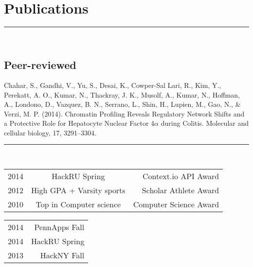 \documentclass[letterpaper]{deedy-resume} %
\begin{document}
\sectionspace

\section{Publications}
\normalfont
\hrule height .1pt \leavevmode \\
\vspace{2 mm}
\subsection{Peer-reviewed}
\textbullet{} Chahar, S., Gandhi, V., Yu, S., Desai, K., Cowper-Sal Lari, R., Kim, Y., Perekatt, A. O., Kumar, N., Thackray, J. K., Musolf, A., Kumar, N., Hoffman, A., Londono, D., Vazquez, B. N., Serrano, L., Shin, H., Lupien, M., Gao, N., \& Verzi, M. P. (2014). Chromatin Profiling Reveals Regulatory Network Shifts and a Protective Role for Hepatocyte Nuclear Factor 4$\alpha$ during Colitis. Molecular and cellular biology, 17, 3291–3304.

\sectionspace

\hfill
{}
\vspace{1 mm}
\normalfont
\hrule height .1pt \leavevmode \\
\vspace{2 mm}
\normalfont
\fontsize{10pt}{12pt}
\selectfont
\begin{minipage}[t]{0.66\textwidth}
\begin{tabular}{lcr}
2014 & HackRU Spring & Context.io API Award \\
2012 & High GPA + Varsity sports & Scholar Athlete Award \\
2010 & Top in Computer science & Computer Science Award\\

\end{tabular}
\end{minipage}
\begin{minipage}[t]{0.33\textwidth}
\hfill	
\begin{tabular}{lr}
2014 & PennApps Fall \\ 
2014 & HackRU Spring  \\
2013 & HackNY Fall \\

\end{tabular}    
\end{minipage}




\sectionspace %
\end{document}

